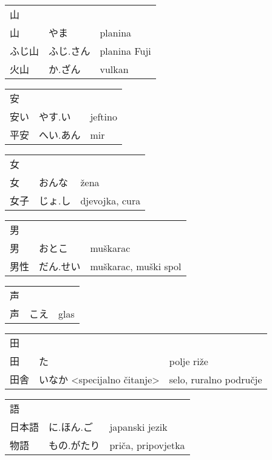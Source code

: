 

\newenvironment{dictentry}[1]{
	\begin{tabular}{p{2cm} p{3cm} p{10cm}}
		#1 &&\\
}{
	\end{tabular}
	\vspace{20pt}
}

\newcommand{\example}[3]{
	\hspace*{\fill}#1 & #2 & #3\\
}

\author{ロボット君}


\begin{dictentry}{山}
\example{山}{やま}{planina}
\example{ふじ山}{ふじ.さん}{planina Fuji}
\example{火山}{か.ざん}{vulkan}
\end{dictentry}

\begin{dictentry}{安}
\example{安い}{やす.い}{jeftino}
\example{平安}{へい.あん}{mir}
\end{dictentry}

\begin{dictentry}{女}
\example{女}{おんな}{žena}
\example{女子}{じょ.し}{djevojka, cura}
\end{dictentry}

\begin{dictentry}{男}
\example{男}{おとこ}{muškarac}
\example{男性}{だん.せい}{muškarac, muški spol}
\end{dictentry}

\begin{dictentry}{声}
\example{声}{こえ}{glas}
\end{dictentry}

\begin{dictentry}{田}
\example{田}{た}{polje riže}
\example{田舎}{いなか <specijalno čitanje>}{selo, ruralno područje}
\end{dictentry}

\begin{dictentry}{語}
\example{日本語}{に.ほん.ご}{japanski jezik}
\example{物語}{もの.がたり}{priča, pripovjetka}
\end{dictentry}


